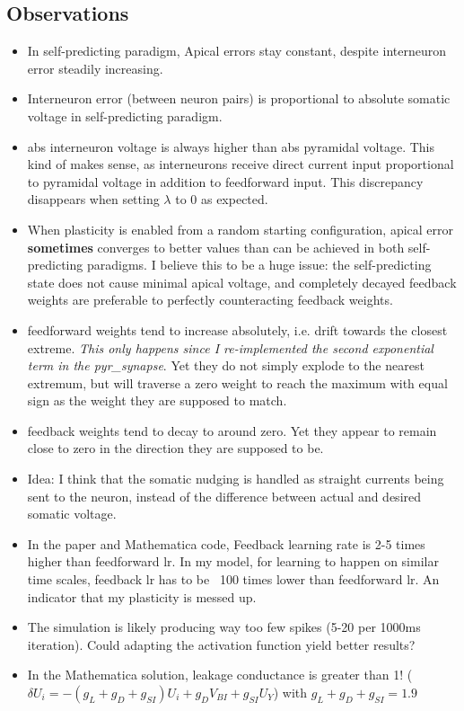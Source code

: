 \documentclass[12pt,a4paper,titlepage]{report}
\begin{document}
\subsection*{Observations}

\begin{itemize}
  \item In self-predicting paradigm, Apical errors stay constant, despite interneuron error steadily increasing.
  \item Interneuron error (between neuron pairs) is proportional to absolute somatic voltage in self-predicting paradigm.
  \item abs interneuron voltage is always higher than abs pyramidal voltage. This kind of makes sense, as interneurons receive direct current input proportional to pyramidal voltage in addition to feedforward input. This discrepancy disappears when setting $\lambda$ to 0 as expected.
  \item When plasticity is enabled from a random starting configuration, apical error \textbf{sometimes} converges to better values than can be achieved in both self-predicting paradigms. I believe this to be a huge issue: the self-predicting state does not cause minimal apical voltage, and completely decayed feedback weights are preferable to perfectly counteracting feedback weights.
  \item feedforward weights tend to increase absolutely, i.e. drift towards the closest extreme. \textit{This only happens since I re-implemented the second exponential term in the pyr\_synapse}. Yet they do not simply explode to the nearest extremum, but will traverse a zero weight to reach the maximum with equal sign as the weight they are supposed to match.
  \item feedback weights tend to decay to around zero. Yet they appear to remain close to zero in the direction they are supposed to be.
  \item Idea: I think that the somatic nudging is handled as straight currents being sent to the neuron, instead of the difference between actual and desired somatic voltage.
  \item In the paper and Mathematica code, Feedback learning rate is 2-5 times higher than feedforward lr. In my model, for learning to happen on similar time scales, feedback lr has to be ~100 times lower than feedforward lr. An indicator that my plasticity is messed up.
  \item The simulation is likely producing way too few spikes (5-20 per 1000ms iteration). Could adapting the activation function yield better results?
  \item In the Mathematica solution, leakage conductance is greater than 1! ($\delta U_i = -(g_L + g_D + g_{SI}) U_i + g_D V_{BI} + g_{SI} U_Y$) with $g_L + g_D + g_{SI} = 1.9$
\end{itemize}
\end{document}
